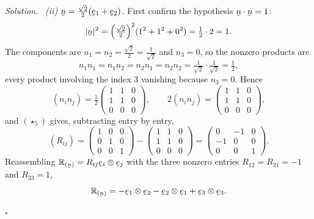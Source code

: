 \documentclass[17pt,a4paper]{extreport}
\DeclareRobustCommand{\vek}[1]{\underaccent{\tilde}{#1}}
\newcommand{\Refl}[1]{\mathbb{R}_{(#1)}}
\newcommand{\be}{\vek{e}}
\newcommand{\bn}{\vek{n}}
\newcommand{\ip}[2]{#1\cdot#2}
\theoremstyle{scplain}
\theoremstyle{scdefn}
\theoremstyle{scplain}
\newenvironment{solution}
 {\par\smallskip\noindent\textit{Solution.}\ }
 {\hfill$\square$\par\medskip}
\begin{document}
\begin{solution}
\emph{(ii) $\bn=\tfrac{\sqrt2}{2}(\be_1+\be_2)$.} First confirm the
hypothesis $\ip\bn\bn=1$:
\[
   |\bn|^{2}=\Big(\tfrac{\sqrt2}{2}\Big)^{2}(1^{2}+1^{2}+0^{2})
   =\tfrac12\cdot2=1 .
\]
The components are $n_1=n_2=\tfrac{\sqrt2}{2}=\tfrac{1}{\sqrt2}$ and
$n_3=0$, so the nonzero products are
\[
   n_1n_1=n_1n_2=n_2n_1=n_2n_2=\tfrac{1}{\sqrt2}\cdot\tfrac{1}{\sqrt2}
   =\tfrac12 ,
\]
every product involving the index $3$ vanishing because $n_3=0$. Hence
\[
   (n_in_j)=\tfrac12\begin{pmatrix}1&1&0\\1&1&0\\0&0&0\end{pmatrix},
   \qquad 2(n_in_j)=\begin{pmatrix}1&1&0\\1&1&0\\0&0&0\end{pmatrix},
\]
and $(\star_5)$ gives, subtracting entry by entry,
\[
   (R_{ij})=\begin{pmatrix}1&0&0\\0&1&0\\0&0&1\end{pmatrix}
   -\begin{pmatrix}1&1&0\\1&1&0\\0&0&0\end{pmatrix}
   =\begin{pmatrix}0&-1&0\\-1&0&0\\0&0&1\end{pmatrix}.
\]
Reassembling $\Refl{\bn}=R_{ij}\be_i\otimes\be_j$ with the three nonzero
entries $R_{12}=R_{21}=-1$ and $R_{33}=1$,
\[
   \Refl{\bn}=-\be_1\otimes\be_2-\be_2\otimes\be_1+\be_3\otimes\be_3 .
\]



\end{solution}
\end{document}
